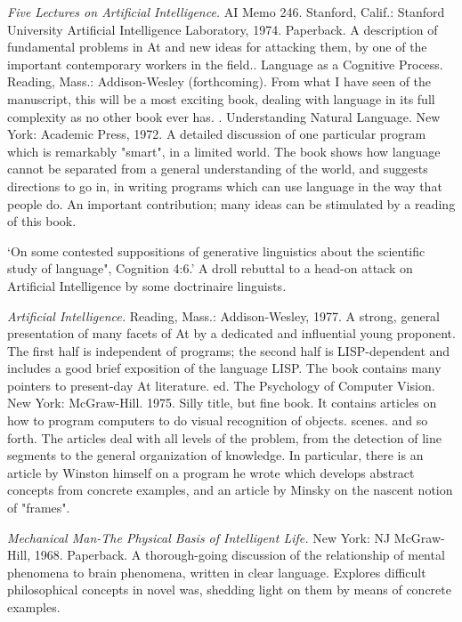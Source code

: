  {\sl Five Lectures on Artificial Intelligence.} AI Memo 246. Stanford, Calif.: Stanford University Artificial Intelligence Laboratory, 1974. Paperback. A description of fundamental problems in At and new ideas for attacking them, by one of the important contemporary workers in the field.. Language as a Cognitive Process. Reading, Mass.: Addison-Wesley (forthcoming). From what I have seen of the manuscript, this will be a most exciting book, dealing with language in its full complexity as no other book ever has. . Understanding Natural Language. New York: Academic Press, 1972. A detailed discussion of one particular program which is remarkably "smart", in a limited world. The book shows how language cannot be separated from a general understanding of the world, and suggests directions to go in, in writing programs which can use language in the way that people do. An important contribution; many ideas can be stimulated by a reading of this book.

 `On some contested suppositions of generative linguistics about the scientific study of language", Cognition 4:6.' A droll rebuttal to a head-on attack on Artificial Intelligence by some doctrinaire linguists.

 {\sl Artificial Intelligence.} \llap{*\enspace}Reading, Mass.: Addison-Wesley, 1977. A strong, general presentation of many facets of At by a dedicated and influential young proponent. The first half is independent of programs; the second half is LISP-dependent and includes a good brief exposition of the language LISP. The book contains many pointers to present-day At literature. ed. The Psychology of Computer Vision. New York: McGraw-Hill. 1975. Silly title, but fine book. It contains articles on how to program computers to do visual recognition of objects. scenes. and so forth. The articles deal with all levels of the problem, from the detection of line segments to the general organization of knowledge. In particular, there is an article by Winston himself on a program he wrote which develops abstract concepts from concrete examples, and an article by Minsky on the nascent notion of "frames".

 {\sl Mechanical Man-The Physical Basis of Intelligent Life.} \llap{*\enspace}New York: NJ McGraw-Hill, 1968. Paperback. A thorough-going discussion of the relationship of mental phenomena to brain phenomena, written in clear language. Explores difficult philosophical concepts in novel was, shedding light on them by means of concrete examples.
